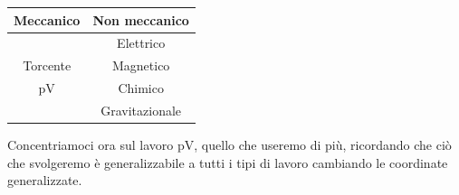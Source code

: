 \documentclass[10pt,a4paper]{article}
\begin{document}
\begin{table}[h!]
	\begin{center}
		\begin{tabular}{ || c| c ||}
			\hline
			Meccanico & Non meccanico\\
			\hline
			 & Elettrico\\
			Torcente & Magnetico\\
			 pV& Chimico\\
			 & Gravitazionale\\
			\hline
		\end{tabular}
	\end{center}
\end{table}

Concentriamoci ora sul lavoro pV, quello che useremo di più, ricordando che ciò che svolgeremo è generalizzabile a tutti i tipi di lavoro cambiando le coordinate generalizzate.
\end{document}
